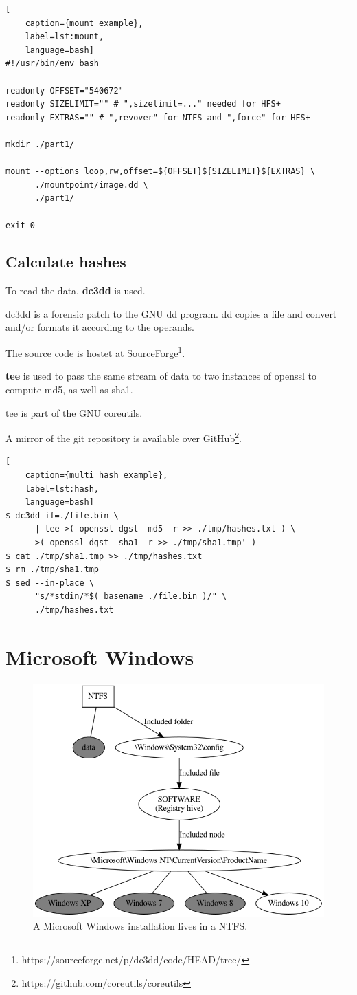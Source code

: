 \begin{lstlisting}[
    caption={mount example},
    label=lst:mount,
    language=bash]
#!/usr/bin/env bash

readonly OFFSET="540672"
readonly SIZELIMIT="" # ",sizelimit=..." needed for HFS+
readonly EXTRAS="" # ",revover" for NTFS and ",force" for HFS+

mkdir ./part1/

mount --options loop,rw,offset=${OFFSET}${SIZELIMIT}${EXTRAS} \
      ./mountpoint/image.dd \
      ./part1/

exit 0
\end{lstlisting}

\subsection{Calculate hashes}

To read the data, \textbf{dc3dd} is used.

dc3dd is a forensic patch to the GNU dd program.
dd copies a file and convert and/or formats it according to the operands.

The source code is hostet at SourceForge\footnote{https://sourceforge.net/p/dc3dd/code/HEAD/tree/
}.

\textbf{tee} is used to pass the same stream of data to two instances of openssl to compute md5, as well as sha1.

tee is part of the GNU coreutils.

A mirror of the git repository is available over GitHub\footnote{https://github.com/coreutils/coreutils}.

\begin{lstlisting}[
    caption={multi hash example},
    label=lst:hash,
    language=bash]
$ dc3dd if=./file.bin \
      | tee >( openssl dgst -md5 -r >> ./tmp/hashes.txt ) \
      >( openssl dgst -sha1 -r >> ./tmp/sha1.tmp' )
$ cat ./tmp/sha1.tmp >> ./tmp/hashes.txt
$ rm ./tmp/sha1.tmp
$ sed --in-place \
      "s/*stdin/*$( basename ./file.bin )/" \
      ./tmp/hashes.txt
\end{lstlisting}

\section{Microsoft Windows}

\begin{figure}[htbp]  %
  \centering
  \includegraphics[width=.5\textwidth]{figures/NTFS-to-Win10.png}
  \caption[NTFS and Microsoft Windows]{A Microsoft Windows installation lives in a NTFS.}
  \label{fig:ntfs-win}
\end{figure}

